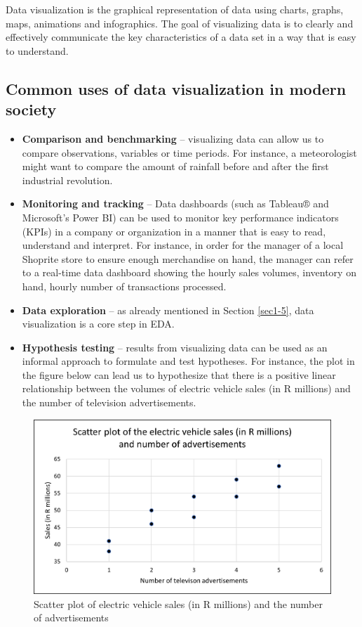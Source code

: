 \documentclass[
]{book}
\begin{document}
Data visualization is the graphical representation of data using charts, graphs, maps, animations and infographics. The goal of visualizing data is to clearly and effectively communicate the key characteristics of a data set in a way that is easy to understand.

\subsection{Common uses of data visualization in modern society}\label{common-uses-of-data-visualization-in-modern-society}

\begin{itemize}
\item
  \textbf{Comparison and benchmarking} -- visualizing data can allow us to compare observations, variables or time periods. For instance, a meteorologist might want to compare the amount of rainfall before and after the first industrial revolution.
\item
  \textbf{Monitoring and tracking} -- Data dashboards (such as Tableau® and Microsoft's Power BI) can be used to monitor key performance indicators (KPIs) in a company or organization in a manner that is easy to read, understand and interpret. For instance, in order for the manager of a local Shoprite store to ensure enough merchandise on hand, the manager can refer to a real-time data dashboard showing the hourly sales volumes, inventory on hand, hourly number of transactions processed.
\item
  \textbf{Data exploration} -- as already mentioned in Section \ref{sec1-5}, data visualization is a core step in EDA.
\item
  \textbf{Hypothesis testing} -- results from visualizing data can be used as an informal approach to formulate and test hypotheses. For instance, the plot in the figure below can lead us to hypothesize that there is a positive linear relationship between the volumes of electric vehicle sales (in R millions) and the number of television advertisements.
\end{itemize}

\begin{figure}

{\centering \includegraphics[width=0.8\linewidth]{Figures-Chapter1/Scatter} 

}

\caption{Scatter plot of electric vehicle sales (in R millions) and the number of advertisements}\label{fig:unnamed-chunk-2}
\end{figure}
\end{document}

